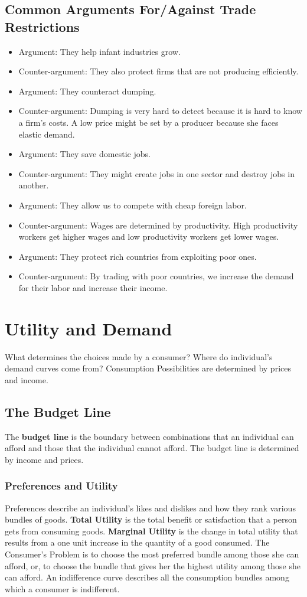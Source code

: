 \documentclass[letterpaper, 12pt]{article}
\begin{document}
\subsection{Common Arguments For/Against Trade Restrictions}
\begin{itemize}
  \item Argument: They help infant industries grow.
  \item Counter-argument: They also protect firms that are not producing
  efficiently.
  \item Argument: They counteract dumping.
  \item Counter-argument: Dumping is very hard to detect because it
  is hard to know a firm's costs. A low price might be set by a producer
  because she faces elastic demand.
  \item Argument: They save domestic jobs.
  \item Counter-argument: They might create jobs in one sector and destroy
  jobs in another.
  \item Argument: They allow us to compete with cheap foreign labor.
  \item Counter-argument: Wages are determined by productivity. High
  productivity workers get higher wages and low productivity workers get lower
  wages.
  \item Argument: They protect rich countries from exploiting poor ones.
  \item Counter-argument: By trading with poor countries, we increase the
  demand for their labor and increase their income.
\end{itemize}

\section{Utility and Demand}
What determines the choices made by a consumer? Where do individual's demand
curves come from? Consumption Possibilities are determined by prices and
income.

\subsection{The Budget Line}
The \textbf{budget line} is the boundary between combinations that an
individual can afford and those that the individual cannot afford. The budget
line is determined by income and prices.

\subsubsection{Preferences and Utility}
Preferences describe an individual's likes and dislikes and how they rank
various bundles of goods. \textbf{Total Utility} is the total benefit or
satisfaction that a person gets from consuming goods. \textbf{Marginal
Utility} is the change in total utility that results from a one unit
increase in the quantity of a good consumed. The Consumer's Problem is to
choose the most preferred bundle among those she can afford, or, to choose
the bundle that gives her the highest utility among those she can afford.
An indifference curve describes all the consumption bundles among which
a consumer is indifferent.
\end{document}
